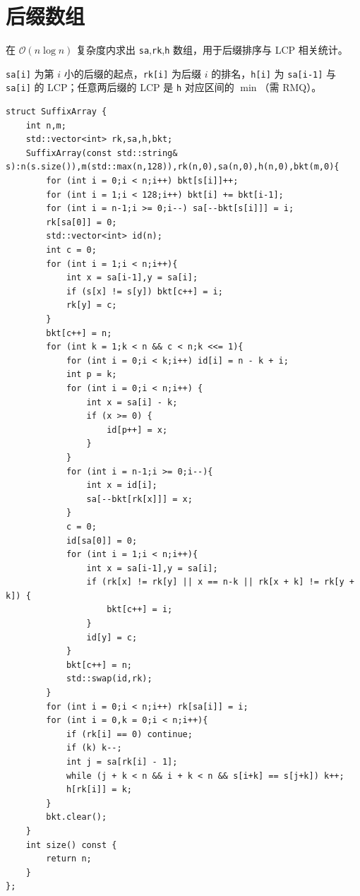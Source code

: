 \section{后缀数组}

在 $\mathcal{O}(n\log n)$ 复杂度内求出 \texttt{sa},\texttt{rk},\texttt{h} 数组，用于后缀排序与 LCP 相关统计。

\texttt{sa[i]} 为第 $i$ 小的后缀的起点，\texttt{rk[i]} 为后缀 $i$ 的排名，\texttt{h[i]} 为 \texttt{sa[i-1]} 与 \texttt{sa[i]} 的 LCP；任意两后缀的 LCP 是 \texttt{h} 对应区间的 $\min$（需 RMQ）。

\begin{lstlisting}
struct SuffixArray {
    int n,m;
    std::vector<int> rk,sa,h,bkt;
    SuffixArray(const std::string& s):n(s.size()),m(std::max(n,128)),rk(n,0),sa(n,0),h(n,0),bkt(m,0){
        for (int i = 0;i < n;i++) bkt[s[i]]++;
        for (int i = 1;i < 128;i++) bkt[i] += bkt[i-1];
        for (int i = n-1;i >= 0;i--) sa[--bkt[s[i]]] = i;
        rk[sa[0]] = 0;
        std::vector<int> id(n);
        int c = 0;
        for (int i = 1;i < n;i++){
            int x = sa[i-1],y = sa[i];
            if (s[x] != s[y]) bkt[c++] = i;
            rk[y] = c;
        }
        bkt[c++] = n;
        for (int k = 1;k < n && c < n;k <<= 1){
            for (int i = 0;i < k;i++) id[i] = n - k + i;
            int p = k;
            for (int i = 0;i < n;i++) {
                int x = sa[i] - k;
                if (x >= 0) {
                    id[p++] = x;
                }
            }
            for (int i = n-1;i >= 0;i--){
                int x = id[i];
                sa[--bkt[rk[x]]] = x;
            }
            c = 0;
            id[sa[0]] = 0;
            for (int i = 1;i < n;i++){
                int x = sa[i-1],y = sa[i];
                if (rk[x] != rk[y] || x == n-k || rk[x + k] != rk[y + k]) {
                    bkt[c++] = i;
                }
                id[y] = c;
            }
            bkt[c++] = n;
            std::swap(id,rk);
        }
        for (int i = 0;i < n;i++) rk[sa[i]] = i;
        for (int i = 0,k = 0;i < n;i++){
            if (rk[i] == 0) continue;
            if (k) k--;
            int j = sa[rk[i] - 1];
            while (j + k < n && i + k < n && s[i+k] == s[j+k]) k++;
            h[rk[i]] = k;
        }
        bkt.clear();
    }
    int size() const {
        return n;
    }
};
\end{lstlisting}
